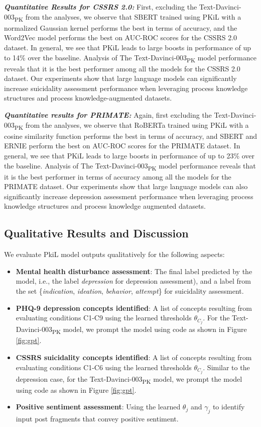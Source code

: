 \documentclass[letterpaper]{article} %
\begin{document}
\textit{\textbf{Quantitative Results for CSSRS 2.0: }}
First, excluding the Text-Davinci-003\textsubscript{PK} from the analyses, we observe that SBERT trained using PKiL with a normalized Gaussian kernel performs the best in terms of accuracy, and the Word2Vec model performs the best on AUC-ROC scores for the CSSRS 2.0 dataset. In general, we see that PKiL leads to large boosts in performance of up to 14\% over the baseline. Analysis of The Text-Davinci-003\textsubscript{PK} model performance reveals that it is the best performer among all the models for the CSSRS 2.0 dataset. Our experiments show that large language models can significantly increase suicidality assessment performance when leveraging process knowledge structures and process knowledge-augmented datasets.

\textit{\textbf{Quantitative results for PRIMATE: }}
Again, first excluding the Text-Davinci-003\textsubscript{PK} from the analyses, we observe that RoBERTa trained using PKiL with a cosine similarity function performs the best in terms of accuracy, and SBERT and ERNIE perform the best on AUC-ROC scores for the PRIMATE dataset. In general, we see that PKiL leads to large boosts in performance of up to 23\% over the baseline. Analysis of The Text-Davinci-003\textsubscript{PK} model performance reveals that it is the best performer in terms of accuracy among all the models for the PRIMATE dataset. Our experiments show that large language models can also significantly increase depression assessment performance when leveraging process knowledge structures and process knowledge augmented datasets.
\subsection{Qualitative Results and Discussion}
We evaluate PkiL model outputs qualitatively for the following aspects:
\begin{itemize}
    \item \textbf{Mental health disturbance assessment}: The final label predicted by the model, i.e., the label \textit{depression} for depression assessment), and a label from the set \{\textit{indication}, \textit{ideation}, \textit{behavior}, \textit{attempt}\} for suicidality assessment.
    \item \textbf{PHQ-9 depression concepts identified}: A list of concepts resulting from evaluating conditions C1-C9 using the learned thresholds $\theta_{C_j}$. For the Text-Davinci-003\textsubscript{PK} model, we prompt the model using code as shown in Figure \ref{fig:gpt}.
    \item \textbf{CSSRS suicidality concepts identified}: A list of concepts resulting from evaluating conditions C1-C6 using the learned thresholds $\theta_{C_j}$. Similar to the depression case, for the Text-Davinci-003\textsubscript{PK} model, we prompt the model using code as shown in Figure \ref{fig:gpt}.
    \item \textbf{Positive sentiment assessment}: Using the learned $\theta_j$ and $\gamma_j$ to identify input post fragments that convey positive sentiment.
\end{itemize}
\end{document}
